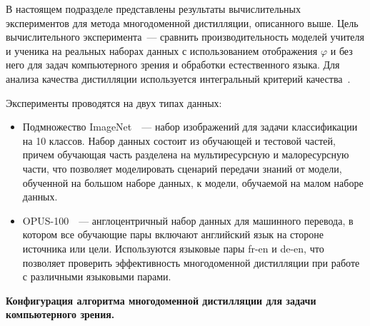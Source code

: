 В настоящем подразделе представлены результаты вычислительных экспериментов для метода многодоменной дистилляции, описанного выше. Цель вычислительного эксперимента~--- сравнить производительность моделей учителя и ученика на реальных наборах данных с использованием отображения $\varphi$ и без него для задач компьютерного зрения и обработки естественного языка. Для анализа качества дистилляции используется интегральный критерий качества~\cite{grabovoi2022probabilistic609999418}.

Эксперименты проводятся на двух типах данных:
\begin{itemize}
    \item Подмножество ImageNet~\cite{imagenet}~--- набор изображений для задачи классификации на 10 классов. Набор данных состоит из обучающей и тестовой частей, причем обучающая часть разделена на мультиресурсную и малоресурсную части, что позволяет моделировать сценарий передачи знаний от модели, обученной на большом наборе данных, к модели, обучаемой на малом наборе данных.
    \item OPUS-100~\cite{opus100}~--- англоцентричный набор данных для машинного перевода, в котором все обучающие пары включают английский язык на стороне источника или цели. Используются языковые пары fr-en и de-en, что позволяет проверить эффективность многодоменной дистилляции при работе с различными языковыми парами.
\end{itemize}

\textbf{Конфигурация алгоритма многодоменной дистилляции для задачи компьютерного зрения.}

